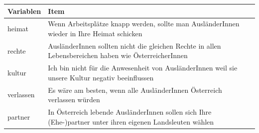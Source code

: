\documentclass[]{article}
\begin{document}
\begin{longtable}[]{@{}ll@{}}
\toprule
\begin{minipage}[b]{0.09\columnwidth}\raggedright\strut
Variablen\strut
\end{minipage} & \begin{minipage}[b]{0.85\columnwidth}\raggedright\strut
Item\strut
\end{minipage}\tabularnewline
\midrule
\endhead
\begin{minipage}[t]{0.09\columnwidth}\raggedright\strut
heimat\strut
\end{minipage} & \begin{minipage}[t]{0.85\columnwidth}\raggedright\strut
Wenn Arbeitsplätze knapp werden, sollte man AusländerInnen wieder in
Ihre Heimat schicken\strut
\end{minipage}\tabularnewline
\begin{minipage}[t]{0.09\columnwidth}\raggedright\strut
rechte\strut
\end{minipage} & \begin{minipage}[t]{0.85\columnwidth}\raggedright\strut
AusländerInnen sollten nicht die gleichen Rechte in allen
Lebensbereichen haben wie ÖsterreicherInnen\strut
\end{minipage}\tabularnewline
\begin{minipage}[t]{0.09\columnwidth}\raggedright\strut
kultur\strut
\end{minipage} & \begin{minipage}[t]{0.85\columnwidth}\raggedright\strut
Ich bin nicht für die Anwesenheit von AusländerInnen weil sie unsere
Kultur negativ beeinflussen\strut
\end{minipage}\tabularnewline
\begin{minipage}[t]{0.09\columnwidth}\raggedright\strut
verlassen\strut
\end{minipage} & \begin{minipage}[t]{0.85\columnwidth}\raggedright\strut
Es wäre am besten, wenn alle AusländerInnen Österreich verlassen
würden\strut
\end{minipage}\tabularnewline
\begin{minipage}[t]{0.09\columnwidth}\raggedright\strut
partner\strut
\end{minipage} & \begin{minipage}[t]{0.85\columnwidth}\raggedright\strut
In Österreich lebende AusländerInnen sollen sich Ihre (Ehe-)partner
unter ihren eigenen Landsleuten wählen\strut
\end{minipage}\tabularnewline

\end{longtable}
\end{document}
